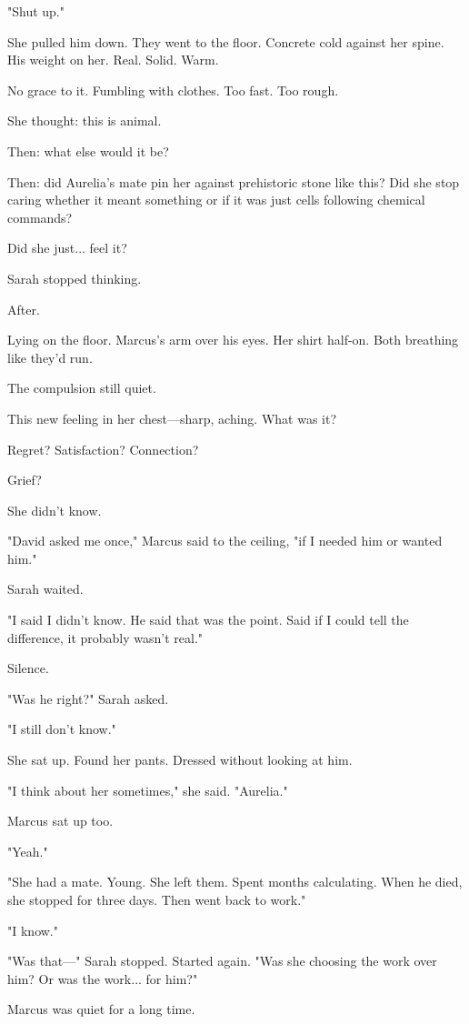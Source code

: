 "Shut up."

She pulled him down. They went to the floor. Concrete cold against her spine. His weight on her. Real. Solid. Warm.

No grace to it. Fumbling with clothes. Too fast. Too rough.

She thought: this is animal.

Then: what else would it be?

Then: did Aurelia's mate pin her against prehistoric stone like this? Did she stop caring whether it meant something or if it was just cells following chemical commands?

Did she just... feel it?

Sarah stopped thinking.

\scenebreak

After.

Lying on the floor. Marcus's arm over his eyes. Her shirt half-on. Both breathing like they'd run.

The compulsion still quiet.

This new feeling in her chest—sharp, aching. What was it?

Regret? Satisfaction? Connection?

Grief?

She didn't know.

"David asked me once," Marcus said to the ceiling, "if I needed him or wanted him."

Sarah waited.

"I said I didn't know. He said that was the point. Said if I could tell the difference, it probably wasn't real."

Silence.

"Was he right?" Sarah asked.

"I still don't know."

She sat up. Found her pants. Dressed without looking at him.

"I think about her sometimes," she said. "Aurelia."

Marcus sat up too.

"Yeah."

"She had a mate. Young. She left them. Spent months calculating. When he died, she stopped for three days. Then went back to work."

"I know."

"Was that—" Sarah stopped. Started again. "Was she choosing the work over him? Or was the work... for him?"

Marcus was quiet for a long time.

